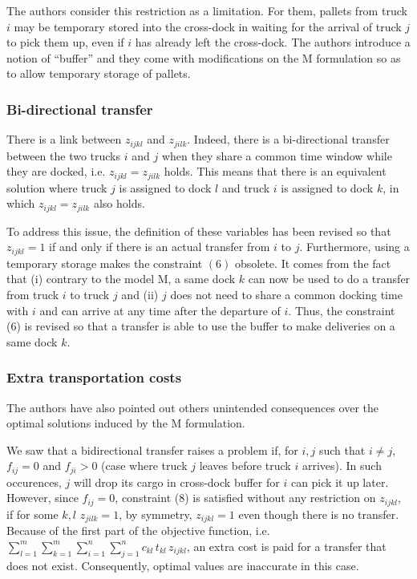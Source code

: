 \documentclass[preprint,12pt,authoryear]{elsarticle}
\begin{document}
The authors consider this restriction as a limitation. 
For them, pallets from truck $i$ may be temporary stored into the cross-dock in waiting for the arrival of truck $j$ to pick them up, even if $i$ has already left the cross-dock.
%
The authors introduce a notion of ``buffer'' and they come with modifications on the M formulation so as to allow temporary storage of pallets.


%
%
\subsubsection{Bi-directional transfer}
There is a link between $z_{ijkl}$ and $z_{jilk}$. Indeed, there is a bi-directional transfer between the two trucks $i$ and $j$ when they share a common time window while they are docked, i.e. $z_{ijkl} = z_{jilk}$ holds.
%
{{This means that there is an equivalent solution where 
truck $j$ is assigned to dock $l$ and truck $i$ is assigned to dock $k$, in which $z_{ijkl} = z_{jilk}$ also holds.}} 

To address this issue, the definition of these variables has been revised so that $z_{ijkl}=1$ if and only if there is an actual transfer from $i$ to $j$. 
Furthermore, using a temporary storage makes the constraint $(6)$ obsolete. It comes from the fact that (i) contrary to the model M, a same dock $k$ can now be used to do a transfer from truck $i$ to truck $j$ and (ii) $j$ does not need to share a common docking time with $i$ and can arrive at any time after the departure of $i$.
Thus, the constraint (6) is revised so that a transfer is able to use the buffer to make deliveries on a same dock $k$. 

%
%
\subsubsection{Extra transportation costs}\label{sec:extratransportationcosts}

The authors have also pointed out others unintended consequences over the optimal solutions induced by the M formulation.

We saw that a bidirectional transfer raises a problem if, for $i,j$ such that $i \neq j$, $f_{ij}=0$ and $f_{ji} > 0$ (case where truck $j$ leaves before truck $i$ arrives). In such occurences, $j$ will drop its cargo in cross-dock buffer for $i$ can pick it up later. 
%
However, since $f_{ij}=0$, constraint (8) is satisfied without any restriction on $z_{ijkl}$, if for some $k,l$ $z_{jilk}=1$, by symmetry, $z_{ijkl}=1$ even though there is no transfer. Because of the first part of the objective function, i.e. $\sum^{m}_{l=1} \sum^{m}_{k=1}\sum^{n}_{i=1} \sum^{n}_{j=1} c_{kl} \, t_{kl} \, z_{ijkl}$, an extra cost is paid for a transfer that does not exist. Consequently, optimal values are inaccurate in this case. 
 
\end{document}
